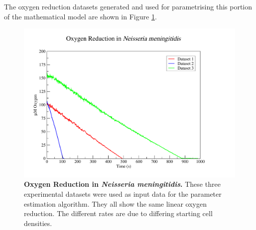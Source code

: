 The oxygen reduction datasets generated and used for parametrising this portion of the mathematical model are shown in Figure \ref{fig:o2data}.

\begin{figure}[p]
 \centering
 \includegraphics[width=14cm, trim=2cm 1cm 4cm 1cm]{./05-oxygenreduction/data/o2_datasets.pdf}
 \caption[{Oxygen Reduction in \textit{Neisseria meningitidis}.}]{{\bf Oxygen Reduction in \textit{Neisseria meningitidis}.} These three experimental datasets were used as input data for the parameter estimation algorithm. They all show the same linear oxygen reduction. The different rates are due to differing starting cell densities.
 \label{fig:o2data}}
\end{figure}
\afterpage{\clearpage}

